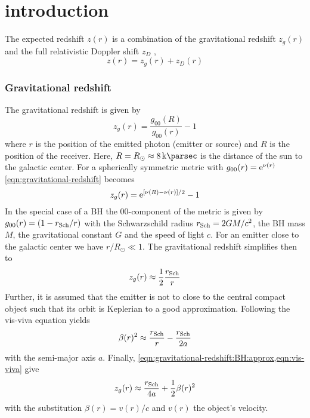 \section{introduction}
The expected redshift $z(r)$ is a combination of the gravitational redshift $z_g(r)$ and the full relativistic Doppler shift $z_D$ \citep{2006ApJ...639L..21Z}, \begin{equation}
	\label{eqn:redshift}
	z(r) = z_g(r) + z_D(r)
\end{equation}

\subsubsection*{Gravitational redshift}
The gravitational redshift is given by \begin{equation}
	\label{eqn:gravitational-redshift}
	z_g(r) = \frac{g_{00}(R)}{g_{00}(r)} - 1
\end{equation} where $r$ is the position of the emitted photon (emitter or source) and $R$ is the position of the receiver. Here, $R = R_\odot \approx \SI{8}{\kilo\parsec}$ is the distance of the sun to the galactic center. For a spherically symmetric metric with $g_{00}(r) = \mathrm{e}^{\nu(r)}$ \cref{eqn:gravitational-redshift} becomes \begin{equation}
	z_g(r) = \mathrm{e}^{[\nu(R) - \nu(r)]/2} - 1
\end{equation} In the special case of a BH the $00$-component of the metric is given by $g_{00}(r) = (1 - r_{\rm Sch}/r)$ with the Schwarzschild radius $r_{\rm Sch} = 2 G M/c^2$, the BH mass $M$, the gravitational constant $G$ and the speed of light $c$. For an emitter close to the galactic center we have $r/R_\odot \ll 1$. The gravitational redshift simplifies then to \begin{equation}
	\label{eqn:gravitational-redshift:BH:approx}
	z_g(r) \approx \frac12 \frac{r_{\rm Sch}}{r}
\end{equation} Further, it is assumed that the emitter is not to close to the central compact object such that its orbit is Keplerian to a good approximation. Following the vis-viva equation yields \begin{equation}
	\label{eqn:vis-viva}
	\beta(r)^2 \approx \frac{r_{\rm Sch}}{r} - \frac{r_{\rm Sch}}{2 a}
\end{equation} with the semi-major axis $a$. Finally, \cref{eqn:gravitational-redshift:BH:approx,eqn:vis-viva} give \begin{equation}
	z_g(r) \approx \frac{r_{\rm Sch}}{4a} + \frac12 \beta(r)^2
\end{equation} with the substitution $\beta(r) = v(r)/c$ and $v(r)$ the object's velocity.

